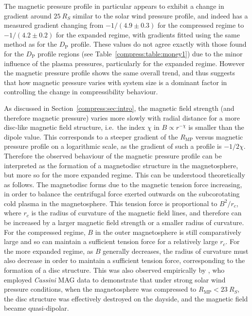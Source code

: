 The magnetic pressure profile in particular appears to exhibit a change in gradient around $\SI{25}{R_S}$ similar to the solar wind pressure profile, and indeed has a measured gradient changing from $-1/(4.9 \pm 0.3)$ for the compressed regime to $ -1/(4.2 \pm 0.2)$ for the expanded regime, with gradients fitted using the same method as for the $D_\mathrm{P}$ profile. These values do not agree exactly with those found for the $D_\mathrm{P}$ profile regions (see Table~\ref{compress:table:money1}) due to the minor influence of the plasma pressures, particularly for the expanded regime. However the magnetic pressure profile shows the same overall trend, and thus suggests that how magnetic pressure varies with system size is a dominant factor in controlling the change in compressibility behaviour.
 
As discussed in Section~\ref{compress:sec:intro}, the magnetic field strength (and therefore magnetic pressure) varies more slowly with radial distance for a more disc-like magnetic field structure, i.e.\ the index $\chi$ in $B \propto r^{-\chi}$ is smaller than the dipole value. This corresponds to a steeper gradient of the $R_\mathrm{MP}$ versus magnetic pressure profile on a logarithmic scale, as the gradient of such a profile is $-1/2\chi$. Therefore the observed behaviour of the magnetic pressure profile can be interpreted as the formation of a magnetodisc structure in the magnetosphere, but more so for the more expanded regime. This can be understood theoretically as follows. The magnetodisc forms due to the magnetic tension force increasing, in order to balance the centrifugal force exerted outwards on the subcorotating cold plasma in the magnetosphere. This tension force is proportional to $B^2/r_c$, where $r_c$ is the radius of curvature of the magnetic field lines, and therefore can be increased by a larger magnetic field strength or a smaller radius of curvature. For the compressed regime, $B$ in the outer magnetosphere is still comparatively large and so can maintain a sufficient tension force for a relatively large $r_c$. For the more expanded regime, as $B$ generally decreases, the radius of curvature must also decrease in order to maintain a sufficient tension force, corresponding to the formation of a disc structure. This was also observed empirically by \citet{arridge2008}, who employed \textit{Cassini} MAG data to demonstrate that under strong solar wind pressure conditions, when the magnetosphere was compressed to $R_\mathrm{MP} < \SI{23}{R_S}$, the disc structure was effectively destroyed on the dayside, and the magnetic field became quasi-dipolar.

